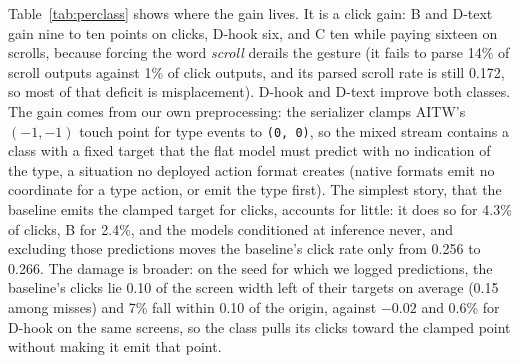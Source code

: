 \documentclass{article}
\begin{document}
Table~\ref{tab:perclass} shows where the gain lives. It is a click gain: B and D-text gain nine to ten points on clicks, D-hook six, and C ten while paying sixteen on scrolls, because forcing the word \emph{scroll} derails the gesture (it fails to parse 14\% of scroll outputs against 1\% of click outputs, and its parsed scroll rate is still 0.172, so most of that deficit is misplacement). D-hook and D-text improve both classes. The gain comes from our own preprocessing: the serializer clamps AITW's $(-1,-1)$ touch point for type events to \texttt{(0, 0)}, so the mixed stream contains a class with a fixed target that the flat model must predict with no indication of the type, a situation no deployed action format creates (native formats emit no coordinate for a type action, or emit the type first). The simplest story, that the baseline emits the clamped target for clicks, accounts for little: it does so for 4.3\% of clicks, B for 2.4\%, and the models conditioned at inference never, and excluding those predictions moves the baseline's click rate only from 0.256 to 0.266. The damage is broader: on the seed for which we logged predictions, the baseline's clicks lie 0.10 of the screen width left of their targets on average (0.15 among misses) and 7\% fall within 0.10 of the origin, against $-0.02$ and 0.6\% for D-hook on the same screens, so the class pulls its clicks toward the clamped point without making it emit that point.
\end{document}
